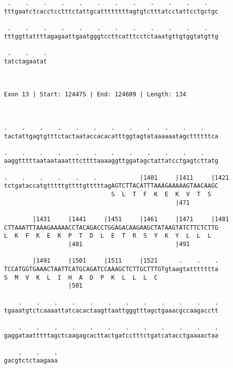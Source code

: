 \documentclass{article}
\begin{document}
\begin{Verbatim}
 .    .    .    .    .    .    .    .    .    .    .    .   
tttgaatctcacctcctttctattgcattttttttagtgtctttatcctattcctgctgc
                                                            
 .    .    .    .    .    .    .    .    .    .    .    .   
tttggttattttagagaattgaatgggtccttcatttcctctaaatgttgtggtatgttg
                                                            
 .    .    .
tatctagaatat
            
            
 
Exon 13 | Start: 124475 | End: 124609 | Length: 134



.    .    .    .    .    .    .    .    .    .    .    .    
tactattgagtgtttctactaataccacacatttggtagtataaaaaatagcttttttca
                                                            
.    .    .    .    .    .    .    .    .    .    .    .    
aaggtttttaataataaatttcttttaaaaggttggatagctattatcctgagtcttatg
                                                            
.    .    .    .    .    .            |1401     |1411     |1421
tctgataccatgtttttgttttgtttttagAGTCTTACATTTAAAGAAAAAGTAACAAGC
                              S  L  T  F  K  E  K  V  T  S  
                                                |471        
  
        |1431     |1441     |1451     |1461     |1471     |1481
CTTAAATTTAAAGAAAAACCTACAGACCTGGAGACAAGAAGCTATAAGTATCTTCTCTTG
L  K  F  K  E  K  P  T  D  L  E  T  R  S  Y  K  Y  L  L  L  
                  |481                          |491        
  
        |1491     |1501     |1511     |1521      .    .    .
TCCATGGTGAAACTAATTCATGCAGATCCAAAGCTCTTGCTTTGTgtaagtattttttta
S  M  V  K  L  I  H  A  D  P  K  L  L  L  C                 
                  |501                                      
  
    .    .    .    .    .    .    .    .    .    .    .    .
tgaaatgtctcaaaattatcacactaagttaattgggtttagctgaaacgccaagacctt
                                                            
    .    .    .    .    .    .    .    .    .    .    .    .
gaggataatttttagctcaagagcacttactgatcctttctgatcatacctgaaaactaa
                                                            
    .    .    .
gacgtctctaagaaa
               
               
 

\end{Verbatim}
\end{document}
